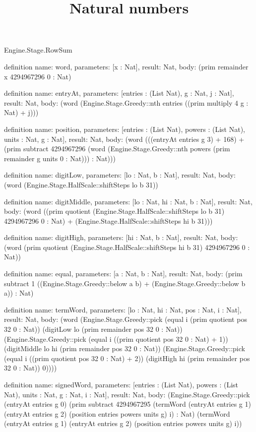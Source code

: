 \begin{lexlean}{Engine.Stage.RowSum}
\title{Natural numbers}
\begin{semanticmodule}
definition{
  name: word,
  parameters: [x : Nat],
  result: Nat,
  body: (prim remainder x 4294967296 0 : Nat)
}

definition{
  name: entryAt,
  parameters: [entries : (List Nat), g : Nat, j : Nat],
  result: Nat,
  body: (word (Engine.Stage.Greedy::nth entries ((prim multiply 4 g : Nat) + j)))
}

definition{
  name: position,
  parameters: [entries : (List Nat), powers : (List Nat), units : Nat, g : Nat],
  result: Nat,
  body: (word (((entryAt entries g 3) + 168) + (prim subtract 4294967296 (word (Engine.Stage.Greedy::nth powers (prim remainder g units 0 : Nat))) : Nat)))
}

definition{
  name: digitLow,
  parameters: [lo : Nat, b : Nat],
  result: Nat,
  body: (word (Engine.Stage.HalfScale::shiftSteps lo b 31))
}

definition{
  name: digitMiddle,
  parameters: [lo : Nat, hi : Nat, b : Nat],
  result: Nat,
  body: (word ((prim quotient (Engine.Stage.HalfScale::shiftSteps lo b 31) 4294967296 0 : Nat) + (Engine.Stage.HalfScale::shiftSteps hi b 31)))
}

definition{
  name: digitHigh,
  parameters: [hi : Nat, b : Nat],
  result: Nat,
  body: (word (prim quotient (Engine.Stage.HalfScale::shiftSteps hi b 31) 4294967296 0 : Nat))
}

definition{
  name: equal,
  parameters: [a : Nat, b : Nat],
  result: Nat,
  body: (prim subtract 1 ((Engine.Stage.Greedy::below a b) + (Engine.Stage.Greedy::below b a)) : Nat)
}

definition{
  name: termWord,
  parameters: [lo : Nat, hi : Nat, pos : Nat, i : Nat],
  result: Nat,
  body: (word (Engine.Stage.Greedy::pick (equal i (prim quotient pos 32 0 : Nat)) (digitLow lo (prim remainder pos 32 0 : Nat)) (Engine.Stage.Greedy::pick (equal i ((prim quotient pos 32 0 : Nat) + 1)) (digitMiddle lo hi (prim remainder pos 32 0 : Nat)) (Engine.Stage.Greedy::pick (equal i ((prim quotient pos 32 0 : Nat) + 2)) (digitHigh hi (prim remainder pos 32 0 : Nat)) 0))))
}

definition{
  name: signedWord,
  parameters: [entries : (List Nat), powers : (List Nat), units : Nat, g : Nat, i : Nat],
  result: Nat,
  body: (Engine.Stage.Greedy::pick (entryAt entries g 0) (prim subtract 4294967295 (termWord (entryAt entries g 1) (entryAt entries g 2) (position entries powers units g) i) : Nat) (termWord (entryAt entries g 1) (entryAt entries g 2) (position entries powers units g) i))
}


\end{semanticmodule}
\end{lexlean}

